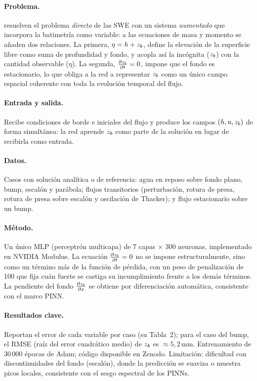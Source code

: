 \paragraph{Problema.}
\cite{dazzi2024} resuelven el problema \emph{directo} de las SWE con un sistema
\emph{aumentado} que incorpora la batimetría como variable: a las ecuaciones de
masa y momento se añaden dos relaciones. La primera, $\eta = h + z_b$, define la
elevación de la superficie libre como suma de profundidad y fondo, y acopla así
la incógnita ($z_b$) con la cantidad observable ($\eta$). La segunda,
$\frac{\partial z_b}{\partial t} = 0$, impone que el fondo es estacionario, lo que obliga a la red a
representar $z_b$ como un único campo espacial coherente con toda la evolución
temporal del flujo.

\paragraph{Entrada y salida.}
Recibe condiciones de borde e iniciales del flujo y produce los campos
$(h, u, z_b)$ de forma simultánea: la red aprende $z_b$ como parte de la
solución en lugar de recibirla como entrada.

\paragraph{Datos.}
Casos con solución analítica o de referencia: agua en reposo sobre fondo plano,
bump, escalón y parábola; flujos transitorios (perturbación, rotura de presa,
rotura de presa sobre escalón y oscilación de Thacker); y flujo estacionario
sobre un bump.

\paragraph{Método.}
Un único MLP (perceptrón multicapa) de 7 capas $\times$ 300 neuronas,
implementado en NVIDIA Modulus. La ecuación $\frac{\partial z_b}{\partial t}=0$ no se impone
estructuralmente, sino como un término más de la función de pérdida, con un peso
de penalización de 100 que fija cuán fuerte se castiga su incumplimiento frente
a los demás términos. La pendiente del fondo $\frac{\partial z_b}{\partial x}$ se obtiene por
diferenciación automática, consistente con el marco PINN.

\paragraph{Resultados clave.}
Reportan el error de cada variable por caso (su Tabla~2); para el caso del bump,
el RMSE (raíz del error cuadrático medio) de $z_b$ es $\approx 5{,}2$\,mm.
Entrenamiento de 30\,000 épocas de Adam; código disponible en Zenodo.
Limitación: dificultad con discontinuidades del fondo (escalón), donde la
predicción se suaviza o muestra picos locales, consistente con el sesgo
espectral de los PINNs.

